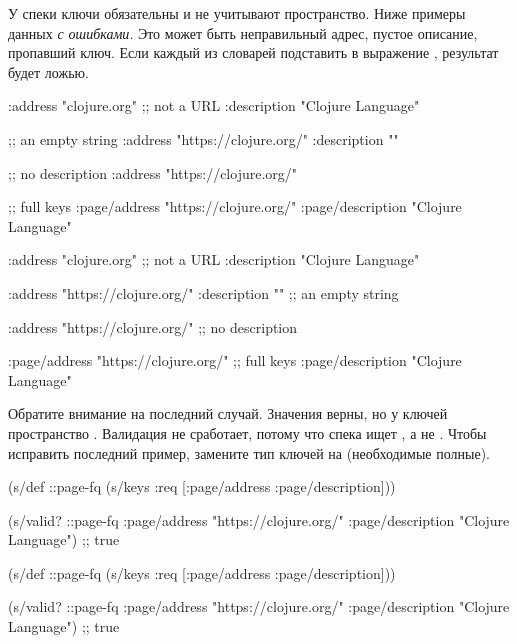У спеки  ключи обязательны и не учитывают пространство. Ниже
примеры данных \emph{с ошибками}. Это может быть неправильный адрес, пустое
описание, пропавший ключ. Если каждый из словарей подставить в выражение
, результат будет ложью.

\ifnarrow

\begin{clojure}
{:address "clojure.org" ;; not a URL
 :description "Clojure Language"}

;; an empty string
{:address "https://clojure.org/"
 :description ""}

;; no description
{:address "https://clojure.org/"}

 ;; full keys
{:page/address "https://clojure.org/"
 :page/description "Clojure Language"}
\end{clojure}

\else

\begin{clojure}
{:address "clojure.org" ;; not a URL
 :description "Clojure Language"}

{:address "https://clojure.org/"
 :description ""} ;; an empty string

{:address "https://clojure.org/"} ;; no description

{:page/address "https://clojure.org/" ;; full keys
 :page/description "Clojure Language"}
\end{clojure}

\fi

Обратите внимание на последний случай. Значения верны, но у ключей пространство
. Валидация не сработает, потому что спека ищет ,
а не . Чтобы исправить последний пример, замените тип
ключей  на  (необходимые полные).


\pagebreaklarge

\ifnarrow

\begin{clojure}
(s/def ::page-fq
  (s/keys :req [:page/address
                :page/description]))

(s/valid? ::page-fq
  {:page/address "https://clojure.org/"
   :page/description "Clojure Language"})
;; true
\end{clojure}

\else

\begin{clojure}
(s/def ::page-fq
  (s/keys :req [:page/address
                :page/description]))

(s/valid? ::page-fq
          {:page/address "https://clojure.org/"
           :page/description "Clojure Language"})
;; true
\end{clojure}

